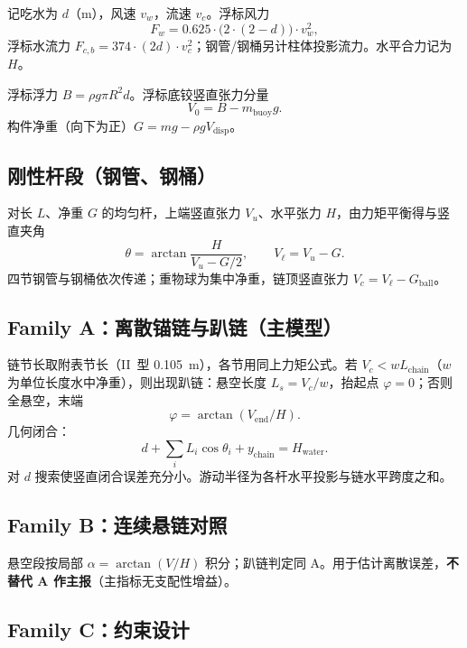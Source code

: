 \documentclass[UTF8,a4paper,12pt]{ctexart}
\begin{document}
记吃水为 \(d\)（m），风速 \(v_w\)，流速 \(v_c\)。浮标风力
\begin{equation}
F_w=0.625\cdot\bigl(2\cdot(2-d)\bigr)\cdot v_w^2,
\end{equation}
浮标水流力 \(F_{c,b}=374\cdot(2d)\cdot v_c^2\)；钢管/钢桶另计柱体投影流力。水平合力记为 \(H\)。

浮标浮力 \(B=\rho g\pi R^2 d\)。浮标底铰竖直张力分量
\begin{equation}
V_0=B-m_{\mathrm{buoy}}g.
\end{equation}
构件净重（向下为正）\(G=mg-\rho g V_{\mathrm{disp}}\)。

\subsection{刚性杆段（钢管、钢桶）}

对长 \(L\)、净重 \(G\) 的均匀杆，上端竖直张力 \(V_u\)、水平张力 \(H\)，由力矩平衡得与竖直夹角
\begin{equation}
\theta=\arctan\frac{H}{V_u-G/2},\qquad V_{\ell}=V_u-G.
\end{equation}
四节钢管与钢桶依次传递；重物球为集中净重，链顶竖直张力 \(V_c=V_{\ell}-G_{\mathrm{ball}}\)。

\subsection{Family A：离散锚链与趴链（主模型）}

链节长取附表节长（II~型 \SI{0.105}{m}），各节用同上力矩公式。若 \(V_c < w L_{\mathrm{chain}}\)（\(w\) 为单位长度水中净重），则出现趴链：悬空长度 \(L_s=V_c/w\)，抬起点 \(\varphi=0\)；否则全悬空，末端
\begin{equation}
\varphi=\arctan(V_{\mathrm{end}}/H).
\end{equation}
几何闭合：
\begin{equation}
d+\sum_i L_i\cos\theta_i + y_{\mathrm{chain}}=H_{\mathrm{water}}.
\end{equation}
对 \(d\) 搜索使竖直闭合误差充分小。游动半径为各杆水平投影与链水平跨度之和。

\subsection{Family B：连续悬链对照}

悬空段按局部 \(\alpha=\arctan(V/H)\) 积分；趴链判定同 A。用于估计离散误差，\textbf{不替代 A 作主报}（主指标无支配性增益）。

\subsection{Family C：约束设计}
\end{document}
